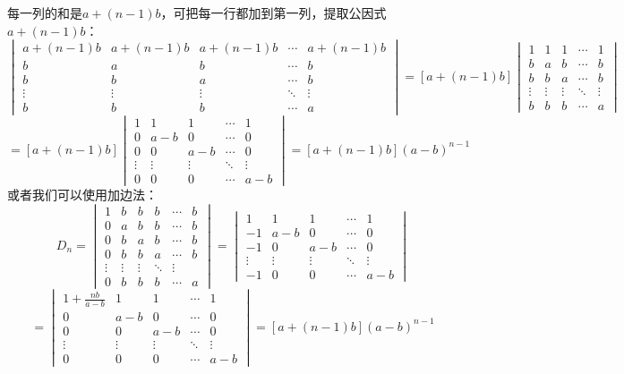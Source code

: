\begin{solution}
    每一列的和是$a+(n-1)b$，可把每一行都加到第一列，提取公因式$a+(n-1)b$：\[
    \begin{vmatrix}a+(n-1)b&a+(n-1)b&a+(n-1)b&\cdots&a+(n-1)b\\b&a&b&\cdots&b\\b&b&a&\cdots&b\\\vdots&\vdots&\vdots&\ddots&\vdots\\b&b&b&\cdots&a\end{vmatrix}    
    =[a+(n-1)b]\begin{vmatrix}1&1&1&\cdots&1\\b&a&b&\cdots&b\\b&b&a&\cdots&b\\\vdots&\vdots&\vdots&\ddots&\vdots\\b&b&b&\cdots&a\end{vmatrix}
    \]\[=
    [a+(n-1)b]\begin{vmatrix}1&1&1&\cdots&1\\0&a-b&0&\cdots&0\\0&0&a-b&\cdots&0\\\vdots&\vdots&\vdots&\ddots&\vdots\\0&0&0&\cdots&a-b\end{vmatrix}=[a+(n-1)b](a-b)^{n-1}
    \]
    或者我们可以使用加边法：\[
    D_n=\begin{vmatrix}1&b&b&b&\cdots&b\\0&a&b&b&\cdots&b\\0&b&a&b&\cdots&b\\0&b&b&a&\cdots&b\\\vdots&\vdots&\vdots&\ddots&\vdots\\0&b&b&b&\cdots&a\end{vmatrix}=\begin{vmatrix}1&1&1&\cdots&1\\-1&a-b&0&\cdots&0\\-1&0&a-b&\cdots&0\\\vdots&\vdots&\vdots&\ddots&\vdots\\-1&0&0&\cdots&a-b\end{vmatrix}\]\[
    =\begin{vmatrix}1+\frac{nb}{a-b}&1&1&\cdots&1\\0&a-b&0&\cdots&0\\0&0&a-b&\cdots&0\\\vdots&\vdots&\vdots&\ddots&\vdots\\0&0&0&\cdots&a-b\end{vmatrix}=[a+(n-1)b](a-b)^{n-1}
    \]
\end{solution}
